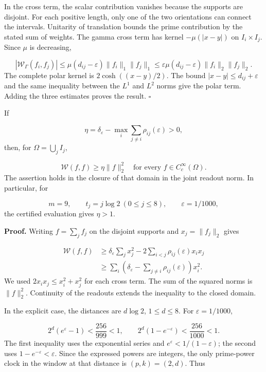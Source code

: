 In the cross term, the scalar contribution vanishes because the supports are disjoint. For each positive length, only one of the two orientations can connect the intervals. Unitarity of translation bounds the prime contribution by the stated sum of weights. The gamma cross term has kernel \(-\mu(|x-y|)\) on \(I_i\times I_j\). Since \(\mu\) is decreasing,

\[
|\mathscr W_\Gamma(f_i,f_j)|
\leq\mu(d_{ij}-\varepsilon)\|f_i\|_1\|f_j\|_1
\leq\varepsilon\mu(d_{ij}-\varepsilon)\|f_i\|_2\|f_j\|_2.
\]
The complete polar kernel is \(2\cosh((x-y)/2)\). The bound \(|x-y|\leq d_{ij}+\varepsilon\) and the same inequality between the \(L^1\) and \(L^2\) norms give the polar term. Adding the three estimates proves the result. \hfill\(\square\)

If

\[
\eta=\delta_\varepsilon-
\max_i\sum_{j\neq i}\rho_{ij}(\varepsilon)>0,
\]
then, for \(\Omega=\bigcup_j I_j\),

\[
\boxed{\mathscr W(f,f)\geq\eta\|f\|_2^2
\quad\text{for every }f\in C_c^\infty(\Omega).}
\]
The assertion holds in the closure of that domain in the joint readout norm. In particular, for

\[
m=9,\qquad t_j=j\log2\ (0\leq j\leq8),\qquad
\varepsilon=1/1000,
\]
the certified evaluation gives \(\eta>1\).

\textbf{Proof.} Writing \(f=\sum_jf_j\) on the disjoint supports and \(x_j=\|f_j\|_2\) gives

\[
\begin{aligned}
\mathscr W(f,f)&\geq
\delta_\varepsilon\sum_jx_j^2
-2\sum_{i<j}\rho_{ij}(\varepsilon)x_ix_j\\
&\geq\sum_i\left(\delta_\varepsilon-
\sum_{j\neq i}\rho_{ij}(\varepsilon)\right)x_i^2.
\end{aligned}
\]
We used \(2x_ix_j\leq x_i^2+x_j^2\) for each cross term. The sum of the squared norms is \(\|f\|_2^2\). Continuity of the readouts extends the inequality to the closed domain.

In the explicit case, the distances are \(d\log2\), \(1\leq d\leq8\). For \(\varepsilon=1/1000\),

\[
2^d(e^\varepsilon-1)<\frac{256}{999}<1,
\qquad 2^d(1-e^{-\varepsilon})<\frac{256}{1000}<1.
\]
The first inequality uses the exponential series and \(e^\varepsilon<1/(1-\varepsilon)\); the second uses \(1-e^{-\varepsilon}<\varepsilon\). Since the expressed powers are integers, the only prime-power clock in the window at that distance is \((p,k)=(2,d)\). Thus

